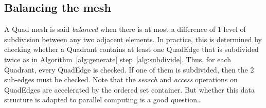 \documentclass[10pt]{article}
\begin{document}
\subsection{Balancing the mesh}
A Quad mesh is said \textit{balanced} when there is at most a difference of 1 level of subdivision between any two adjacent elements. In practice, this is determined by checking whether a Quadrant contains at least one QuadEdge that is subdivided twice as in Algorithm~\ref{alg:generate} step~\ref{alg:subdivide}. Thus, for each Quadrant, every QuadEdge is checked. If one of them is subdivided, then the 2 sub-edges must be checked. Note that the \textit{search} and \textit{access} operations on QuadEdges are accelerated by the ordered set container. But whether this data structure is adapted to parallel computing is a good question\ldots
\end{document}
